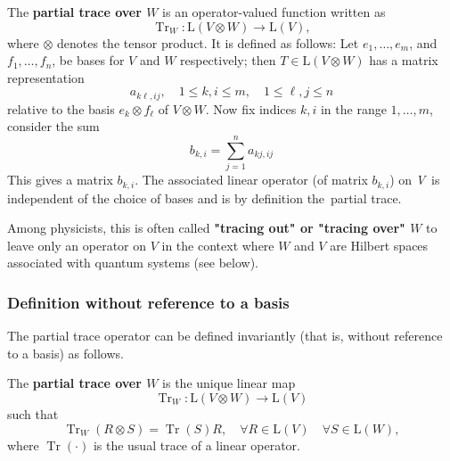 \documentclass[
	11pt, %
	fleqn, %
	a4paper, %
]{LegrandOrangeBook}
\begin{document}
\begin{definition}\label{defn:partial-trace-1}
The \textbf{partial trace over $W$} is an operator-valued function written as
$$
\operatorname{Tr}_W: \mathrm{L}(V \otimes W) \rightarrow \mathrm{L}(V),
$$
where $\otimes$ denotes the tensor product. It is defined as follows: Let $e_1, \ldots, e_m$, and $f_1, \ldots, f_n$, be bases for $V$ and $W$ respectively; then $T \in \mathrm{L}(V \otimes W)$ has a matrix representation
$$
a_{k \ell, i j}, \quad 1 \leq k, i \leq m, \quad 1 \leq \ell, j \leq n
$$
relative to the basis $e_k \otimes f_{\ell}$ of $V \otimes W$. Now fix indices $k, i$ in the range $1, \ldots, m$, consider the sum
$$
b_{k, i}=\sum_{j=1}^n a_{k j, i j}
$$
This gives a matrix $b_{k, i}$. The associated linear operator (of matrix $b_{k, i}$) on \textit{V} is independent of the choice of bases and is by definition the partial trace.
\end{definition}

Among physicists, this is often called \textbf{"tracing out" or "tracing over" $W$} to leave only an operator on $V$ in the context where $W$ and $V$ are Hilbert spaces associated with quantum systems (see below).

\subsubsection{Definition without reference to a basis}

The partial trace operator can be defined invariantly (that is, without reference to a basis) as follows.

\begin{definition}
The \textbf{partial trace over $W$} is the unique linear map
$$
\operatorname{Tr}_W: \mathrm{L}(V \otimes W) \rightarrow \mathrm{L}(V)
$$
such that
\begin{equation}\label{eq:partial-trace-defn}
    \operatorname{Tr}_W(R \otimes S)=\operatorname{Tr}(S) R, \quad \forall R \in \mathrm{L}(V) \quad \forall S \in \mathrm{L}(W),
\end{equation}
where $\operatorname{Tr}(\cdot)$ is the usual trace of a linear operator.
\end{definition}
\end{document}
